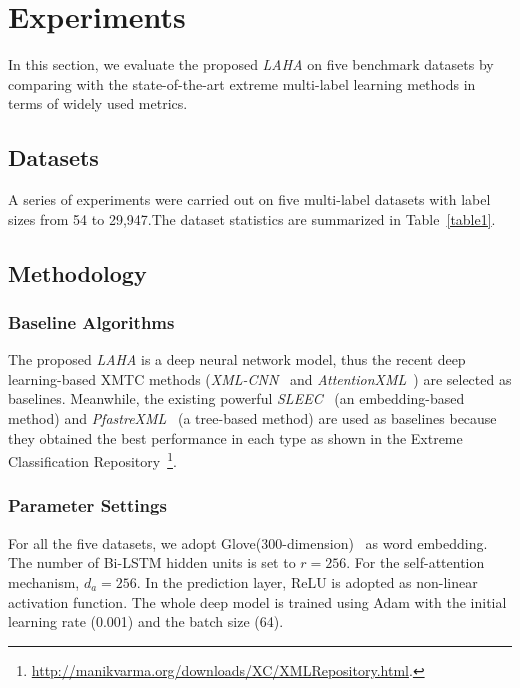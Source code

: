 \documentclass[runningheads]{llncs}
\begin{document}
\section{Experiments}


In this section, we evaluate the proposed \textit{LAHA} on five benchmark datasets by comparing with the state-of-the-art extreme multi-label learning methods in terms of widely used metrics. 



\vspace{-4mm}
\subsection{Datasets}
A series of experiments were carried out on five multi-label datasets with label sizes from 54 to 29,947.The dataset statistics are summarized in Table~\ref{table1}. 


\vspace{-10mm}
\subsection{Methodology}
\subsubsection{Baseline Algorithms}
The proposed \textit{LAHA} is a deep neural network model, thus the recent deep learning-based XMTC methods (\textit{XML-CNN}~\cite{ref_article6} and \textit{AttentionXML}~\cite{ref_article7}) are selected as baselines. 
Meanwhile, the existing powerful 
 \textit{SLEEC}~\cite{ref_article9} (an embedding-based method) and \textit{PfastreXML}~\cite{ref_article10} (a tree-based method) are used as baselines because they obtained the best performance in each type as shown in the Extreme Classification Repository~\footnote{\url{http://manikvarma.org/downloads/XC/XMLRepository.html}.\label{repository}}. 
\vspace{-4mm}
\subsubsection{Parameter Settings}
For all the five datasets, we adopt Glove(300-dimension)~\cite{ref_article12} as word embedding. The number of Bi-LSTM hidden units is set to $r=256$. For the self-attention mechanism, ${d}_{a}=256$. In the prediction layer, ReLU is adopted as non-linear activation function. The whole deep model is trained using Adam with the initial learning rate (0.001) and the batch size (64).
\end{document}

